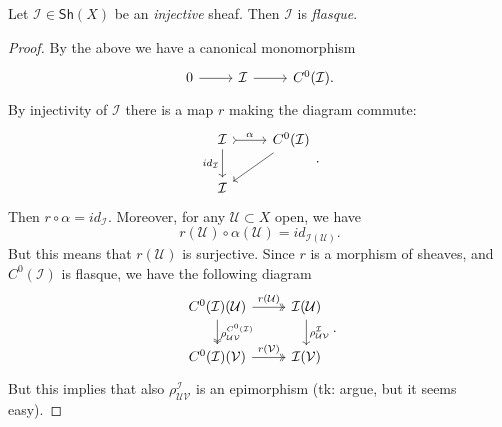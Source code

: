 \documentclass[../Main]{subfiles}
\begin{document}
\begin{prop}[]
	Let $\mathcal{I} \in \mathsf{Sh}\left(X\right)$ be an {\em injective} sheaf.
	Then $\mathcal{I}$ is {\em flasque}.
\end{prop}
\begin{proof}
	By the above we have a canonical monomorphism
	\begin{equation}
	\begin{tikzcd}
		0 \arrow[r, "", rightarrow] &
		\mathcal{I} \arrow[r, "", rightarrow] &
		C^0(\mathcal{I}).
	\end{tikzcd}
	\end{equation} 
	By injectivity of $\mathcal{I}$ there is a map $r$ making the diagram commute:
	\begin{equation}
	\begin{tikzcd}
		\mathcal{I} \arrow[r, "\alpha", rightarrowtail] 
		\arrow[d, "id_{\mathcal{I}}"', rightarrow] &
		C^0(\mathcal{I}) \arrow[ld, "", rightarrow] \\
		\mathcal{I} &
	\end{tikzcd}
	.\end{equation} 
	Then $r \circ \alpha = id_{\mathcal{I}}$.
	Moreover, for any $\mathcal{U} \subset X$ open, we have
	\begin{equation}
		r(\mathcal{U}) \circ \alpha(\mathcal{U}) = id_{\mathcal{I}(\mathcal{U})}
	.\end{equation} 
	But this means that $r(\mathcal{U})$ is surjective.
	Since $r$ is a morphism of sheaves, and $C^0(\mathcal{I})$ is flasque,
	we have the following diagram
	\begin{equation}
	\begin{tikzcd}
		C^0(\mathcal{I})(\mathcal{U}) \arrow[r, "r(\mathcal{U})", twoheadrightarrow] 
		\arrow[d, "\rho^{C^0(\mathcal{I})}_{\mathcal{UV}}", twoheadrightarrow] &
		\mathcal{I}(\mathcal{U}) \arrow[d, "\rho^{\mathcal{I}}_{\mathcal{UV}}", rightarrow] \\
		C^0(\mathcal{I})(\mathcal{V}) \arrow[r, "r(\mathcal{V})", twoheadrightarrow] &
		\mathcal{I}(\mathcal{V})
	\end{tikzcd}
	.\end{equation} 
	But this implies that also $\rho^{\mathcal{I}}_{\mathcal{UV}}$ is an
	epimorphism (tk: argue, but it seems easy).
\end{proof}
\end{document}
